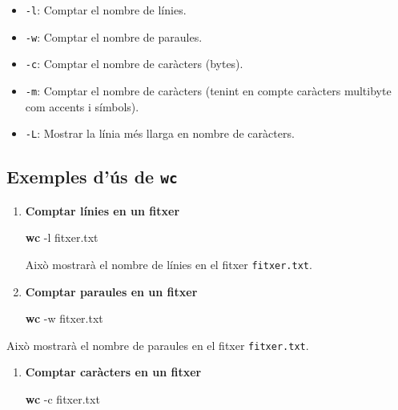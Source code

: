\documentclass[
  12 pt,
  a4paper,
]{article}
\newenvironment{Shaded}{\begin{snugshade}}{\end{snugshade}}
\newcommand{\AttributeTok}[1]{\textcolor[rgb]{0.13,0.29,0.53}{#1}}
\newcommand{\FunctionTok}[1]{\textcolor[rgb]{0.13,0.29,0.53}{\textbf{#1}}}
\newcommand{\NormalTok}[1]{#1}
\providecommand{\tightlist}{%
  \setlength{\itemsep}{0pt}\setlength{\parskip}{0pt}}
\begin{document}
\begin{itemize}
\tightlist
\item
  \texttt{-l}: Comptar el nombre de línies.
\item
  \texttt{-w}: Comptar el nombre de paraules.
\item
  \texttt{-c}: Comptar el nombre de caràcters (bytes).
\item
  \texttt{-m}: Comptar el nombre de caràcters (tenint en compte
  caràcters multibyte com accents i símbols).
\item
  \texttt{-L}: Mostrar la línia més llarga en nombre de caràcters.
\end{itemize}

\subsection{\texorpdfstring{Exemples d'ús de
\texttt{wc}}{Exemples d'ús de wc}}\label{exemples-duxfas-de-wc}

\begin{enumerate}
\def\labelenumi{\arabic{enumi}.}
\item
  \textbf{Comptar línies en un fitxer}

\begin{Shaded}
\begin{Highlighting}[]
\FunctionTok{wc} \AttributeTok{{-}l}\NormalTok{ fitxer.txt}
\end{Highlighting}
\end{Shaded}

  Això mostrarà el nombre de línies en el fitxer \texttt{fitxer.txt}.
\item
  \textbf{Comptar paraules en un fitxer}

\begin{Shaded}
\begin{Highlighting}[]
\FunctionTok{wc} \AttributeTok{{-}w}\NormalTok{ fitxer.txt}
\end{Highlighting}
\end{Shaded}
\end{enumerate}

Això mostrarà el nombre de paraules en el fitxer \texttt{fitxer.txt}.

\begin{enumerate}
\def\labelenumi{\arabic{enumi}.}
\setcounter{enumi}{2}
\item
  \textbf{Comptar caràcters en un fitxer}

\begin{Shaded}
\begin{Highlighting}[]
\FunctionTok{wc} \AttributeTok{{-}c}\NormalTok{ fitxer.txt}
\end{Highlighting}
\end{Shaded}
\end{enumerate}
\end{document}
